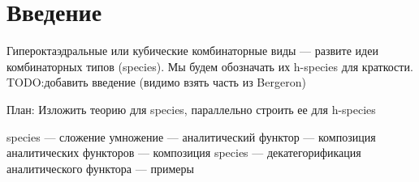 \section{Введение}
Гипероктаэдральные или кубические комбинаторные виды --- развите идеи комбинаторных типов (species).
Мы будем обозначать их h-species для краткости.
TODO:добавить введение (видимо взять часть из Bergeron)

План:
Изложить теорию для species, параллельно строить ее для h-species

species --- сложение умножение --- аналитический функтор --- композиция
аналитических функторов --- композиция species --- декатегорификация
аналитического функтора --- примеры

